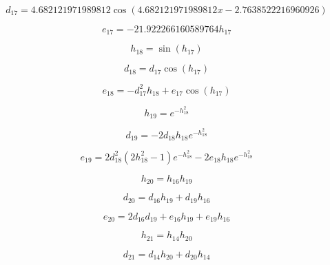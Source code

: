 \begin{equation}
d_{17}=4.682121971989812 \cos{\left(4.682121971989812 x - 2.7638522216960926 \right)}
\end{equation}


\begin{equation}
e_{17}=- 21.922266160589764 h_{17}
\end{equation}


\begin{equation}
h_{18}=\sin{\left(h_{17} \right)}
\end{equation}


\begin{equation}
d_{18}=d_{17} \cos{\left(h_{17} \right)}
\end{equation}


\begin{equation}
e_{18}=- d_{17}^{2} h_{18} + e_{17} \cos{\left(h_{17} \right)}
\end{equation}


\begin{equation}
h_{19}=e^{- h_{18}^{2}}
\end{equation}


\begin{equation}
d_{19}=- 2 d_{18} h_{18} e^{- h_{18}^{2}}
\end{equation}


\begin{equation}
e_{19}=2 d_{18}^{2} \left(2 h_{18}^{2} - 1\right) e^{- h_{18}^{2}} - 2 e_{18} h_{18} e^{- h_{18}^{2}}
\end{equation}


\begin{equation}
h_{20}=h_{16} h_{19}
\end{equation}


\begin{equation}
d_{20}=d_{16} h_{19} + d_{19} h_{16}
\end{equation}


\begin{equation}
e_{20}=2 d_{16} d_{19} + e_{16} h_{19} + e_{19} h_{16}
\end{equation}


\begin{equation}
h_{21}=h_{14} h_{20}
\end{equation}


\begin{equation}
d_{21}=d_{14} h_{20} + d_{20} h_{14}
\end{equation}


